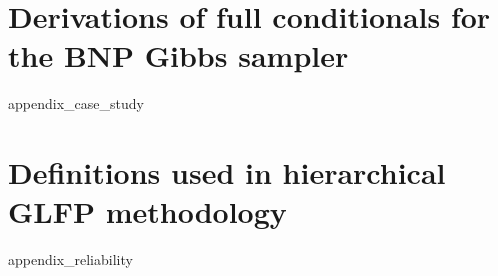 \documentclass[11pt]{isuthesis}
\begin{document}
\chapter{Derivations of full conditionals for the BNP Gibbs sampler}
{appendix_case_study}

\chapter{Definitions used in hierarchical GLFP methodology}
{appendix_reliability}

\renewcommand{\bibname}{\centerline{BIBLIOGRAPHY}}
\unappendixtitle
\newpage
{}
{}

\end{document}
